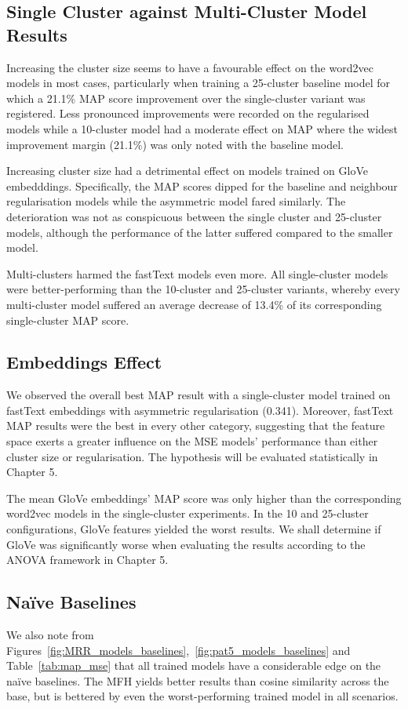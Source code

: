 \subsection{Single Cluster against Multi-Cluster Model Results}
Increasing the cluster size seems to have a favourable effect on the word2vec models in most cases, particularly when training a 25-cluster baseline model for which a 21.1\% \ac{MAP} score improvement over the single-cluster variant was registered.  Less pronounced improvements were recorded on the regularised models while a 10-cluster model had a moderate effect on \ac{MAP} where the widest improvement margin (21.1\%) was only noted with the baseline model.  

Increasing cluster size had a detrimental effect on models trained on GloVe embedddings.  Specifically, the \ac{MAP} scores dipped for the baseline and neighbour regularisation models while the asymmetric model fared similarly.  The deterioration was not as conspicuous between the single cluster and 25-cluster models, although the performance of the latter suffered compared to the smaller model.  

Multi-clusters harmed the fastText models even more.  All single-cluster models were better-performing than the 10-cluster and 25-cluster variants, whereby every multi-cluster model suffered an average decrease of 13.4\% of its corresponding single-cluster \ac{MAP} score.  

\subsection{Embeddings Effect} \label{ustalov_embeddings}
We observed the overall best \ac{MAP} result with a single-cluster model trained on fastText embeddings with asymmetric regularisation (0.341).  Moreover, fastText \ac{MAP} results were the best in every other category, suggesting that the feature space exerts a greater influence on the \ac{MSE} models' performance than either cluster size or regularisation.  The hypothesis will be evaluated statistically in Chapter 5.

The mean GloVe embeddings' \ac{MAP} score was only higher than the corresponding word2vec models in the single-cluster experiments.  In the 10 and 25-cluster configurations, GloVe features yielded the worst results.  We shall determine if GloVe was significantly worse when evaluating the results according to the \ac{ANOVA} framework in Chapter 5.

\subsection{Naïve Baselines}
We also note from Figures~\ref{fig:MRR_models_baselines},~\ref{fig:pat5_models_baselines} and Table~\ref{tab:map_mse} that all trained models have a considerable edge on the na\"ive baselines.  The \ac{MFH} yields better results than cosine similarity across the base, but is bettered by even the worst-performing trained model in all scenarios.  

